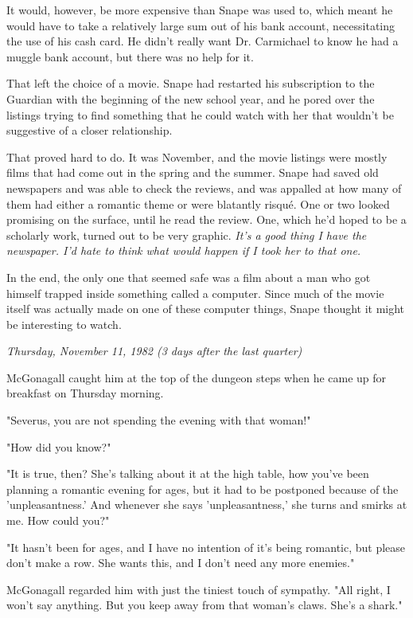 \documentclass[a4paper,11pt]{article}
\begin{document}
It would, however, be more expensive than Snape was used to, which meant he would have to take a relatively large sum out of his bank account, necessitating the use of his cash card. He didn't really want Dr. Carmichael to know he had a muggle bank account, but there was no help for it.

That left the choice of a movie. Snape had restarted his subscription to the Guardian with the beginning of the new school year, and he pored over the listings trying to find something that he could watch with her that wouldn't be suggestive of a closer relationship.

That proved hard to do. It was November, and the movie listings were mostly films that had come out in the spring and the summer. Snape had saved old newspapers and was able to check the reviews, and was appalled at how many of them had either a romantic theme or were blatantly risqué. One or two looked promising on the surface, until he read the review. One, which he'd hoped to be a scholarly work, turned out to be very graphic. \emph{It's a good thing I have the newspaper. I'd hate to think what would happen if I took her to that one.}

In the end, the only one that seemed safe was a film about a man who got himself trapped inside something called a computer. Since much of the movie itself was actually made on one of these computer things, Snape thought it might be interesting to watch.

\emph{Thursday, November 11, 1982 (3 days after the last quarter)}

McGonagall caught him at the top of the dungeon steps when he came up for breakfast on Thursday morning.

"Severus, you are not spending the evening with that woman!"

"How did you know?"

"It is true, then? She's talking about it at the high table, how you've been planning a romantic evening for ages, but it had to be postponed because of the 'unpleasantness.' And whenever she says 'unpleasantness,' she turns and smirks at me. How could you?"

"It hasn't been for ages, and I have no intention of it's being romantic, but please don't make a row. She wants this, and I don't need any more enemies."

McGonagall regarded him with just the tiniest touch of sympathy. "All right, I won't say anything. But you keep away from that woman's claws. She's a shark."
\end{document}
